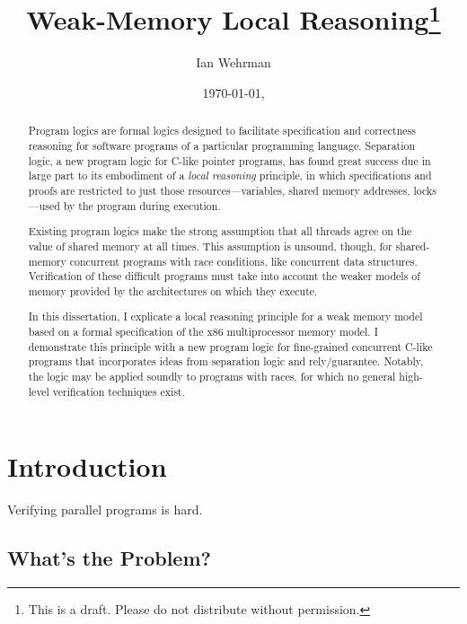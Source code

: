 \documentclass[11pt]{report}
\begin{document}
 

	\author{Ian Wehrman} 
	\title{Weak-Memory Local Reasoning\footnote{This is a draft. Please do not distribute without permission.}} 
	\date{\today, \currenttime}
	\maketitle


\begin{abstract}

Program logics are formal logics designed to facilitate specification and correctness reasoning for software programs of a particular programming language. Separation logic, a new program logic for C-like pointer programs, has found great success due in large part to its embodiment of a \emph{local reasoning} principle, in which specifications and proofs are restricted to just those resources---variables, shared memory addresses, locks---used by the program during execution.

Existing program logics make the strong assumption that all threads agree on the value of shared memory at all times. This assumption is unsound, though, for shared-memory concurrent programs with race conditions, like concurrent data structures. Verification of these difficult programs must take into account the weaker models of memory provided by the architectures on which they execute.

In this dissertation, I explicate a local reasoning principle for a weak memory model based on a formal specification of the x86 multiprocessor memory model. I demonstrate this principle with a new program logic for fine-grained concurrent C-like programs that incorporates ideas from separation logic and rely/guarantee. Notably, the logic may be applied soundly to programs with races, for which no general high-level verification techniques exist.

\end{abstract}

\tableofcontents

\listoffigures

\chapter{Introduction} %
\label{cha:introduction}

Verifying parallel programs is hard.

\section{What's the Problem?} %
\label{sec:whats-the-problem}
\end{document}
